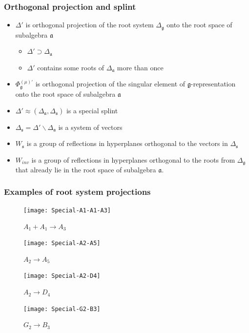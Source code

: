 \documentclass[pdftex]{beamer}
\newcommand{\gf}{\mathfrak{g}}
\newcommand{\af}{\mathfrak{a}}
\newcommand{\sfr}{\mathfrak{s}}
\theoremstyle{definition} \newtheorem{Def}{Definition}
\begin{document}
\begin{frame}
  \frametitle{Orthogonal projection and splint}
  \begin{itemize}
  \item $\Delta'$ is orthogonal projection of the root system $\Delta_{\gf}$ onto the root space of subalgebra $\af$
    \begin{itemize}
    \item $\Delta'\supset\Delta_{\af}$
    \item $\Delta'$ contains some roots of $\Delta_{\af}$ more than once
    \end{itemize}
  \item $\Phi_{\gf}^{(\mu)'}$ is orthogonal projection of the singular element of $\gf$-representation  onto the root space of subalgebra $\af$ 
  \item $\Delta'\approx\left(\Delta_{\af},\Delta_{\sfr}\right)$ is a special splint
  \item $\Delta_{\sfr}=\Delta' \backslash \Delta_{\af}$ is a system of vectors
  \item $W_{\sfr}$ is a group of reflections in hyperplanes orthogonal to the vectors in $\Delta_{\sfr}$
  \item $W_{inv}$ is a group of reflections in hyperplanes orthogonal to the roots from $\Delta_{\gf}$ that already lie in the root space of subalgebra $\af$.
  \end{itemize}
\end{frame}

\begin{frame}
  \frametitle{Examples of root system projections}
  \begin{multicols}{4}
    \begin{figure}[h!tb]
      \texttt{[image: Special-A1-A1-A3]}      
      \caption{$A_1+A_1\to A_3$}
      \label{fig:a1a1a3}
    \end{figure}
    \begin{figure}[h!tb]
      \texttt{[image: Special-A2-A5]}      
      \caption{$A_2\to A_5$}
      \label{fig:a2a5}
    \end{figure}
    \begin{figure}[h!tb]
      \texttt{[image: Special-A2-D4]}
      \caption{$A_2\to D_4$}
      \label{fig:a2d4}
    \end{figure}
    \begin{figure}[h!tb]
      \texttt{[image: Special-G2-B3]}      
      \caption{$G_2\to B_3$}
      \label{fig:g2b3}
    \end{figure}
    
  \end{multicols}

\end{frame}
\end{document}
